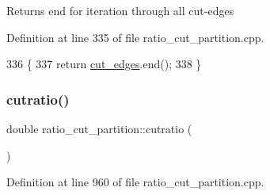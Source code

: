 \begin{DoxyReturn}{Returns}
end for iteration through all cut-\/edges 
\end{DoxyReturn}


Definition at line 335 of file ratio\+\_\+cut\+\_\+partition.\+cpp.


\begin{DoxyCode}
336 \{
337     \textcolor{keywordflow}{return} \mbox{\hyperlink{classratio__cut__partition_a5ab55eef04a72c0be731d848cb9a5d50}{cut\_edges}}.end();
338 \}
\end{DoxyCode}
\mbox{\label{classratio__cut__partition_a0adcba3c7847fcb62b607eebc334c503}} 
\subsubsection{\texorpdfstring{cutratio()}{cutratio()}}
{\footnotesize\ttfamily double ratio\+\_\+cut\+\_\+partition\+::cutratio (\begin{DoxyParamCaption}{ }\end{DoxyParamCaption})\hspace{0.3cm}{\ttfamily [protected]}}



Definition at line 960 of file ratio\+\_\+cut\+\_\+partition.\+cpp.



